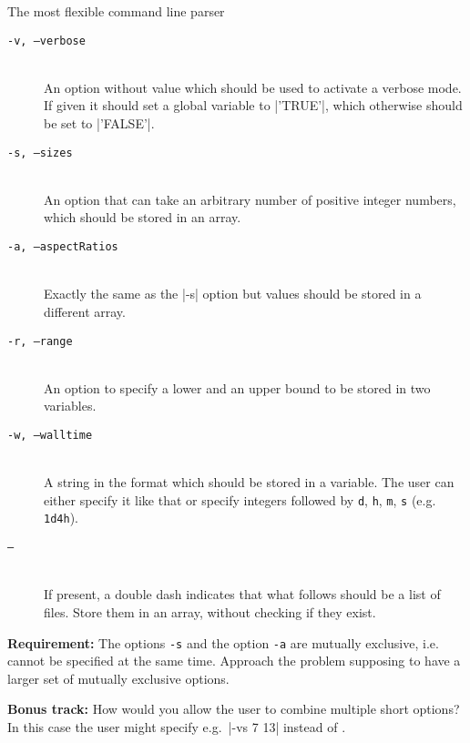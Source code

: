 \begin{exercise}[Inspirational]{The most flexible command line parser}
\begin{description}
        \item[\texttt{-v, --verbose}] ~\\
            An option without value which should be used to activate a verbose mode.
            If given it should set a global variable to \bash|'TRUE'|, which otherwise should be set to \bash|'FALSE'|.
        \item[\texttt{-s, --sizes}] ~\\
            An option that can take an arbitrary number of positive integer numbers, which should be stored in an array.
        \item[\texttt{-a, --aspectRatios}] ~\\
            Exactly the same as the \bash|-s| option but values should be stored in a different array.
        \item[\texttt{-r, --range}] ~\\
            An option to specify a lower and an upper bound to be stored in two variables.
        \item[\texttt{-w, --walltime}] ~\\
            A string in the format  which should be stored in a variable.
            The user can either specify it like that or specify integers followed by \texttt{d}, \texttt{h}, \texttt{m}, \texttt{s} (e.g. \texttt{1d4h}).
        \item[\texttt{--}] ~\\
            If present, a double dash indicates that what follows should be a list of files.
            Store them in an array, without checking if they exist.
    \end{description}
    \textbf{Requirement:} The options \texttt{-s} and the option \texttt{-a} are mutually exclusive, i.e. cannot be specified at the same time.
    Approach the problem supposing to have a larger set of mutually exclusive options.

    \medskip
    \textbf{Bonus track:} How would you allow the user to combine multiple short options?
    In this case the user might specify e.g.\ \bash|-vs 7 13| instead of .
\end{exercise}
